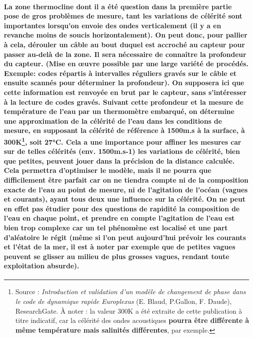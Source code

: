 \documentclass[a4paper,11pt]{article}
\begin{document}
\paragraph{\normalfont La zone thermocline dont il a \'{e}t\'{e} question dans la premi\`{e}re partie pose de \textbf{gros probl\`{e}mes de mesure}, tant les variations de c\'{e}l\'{e}rit\'{e} sont importantes lorsqu'on envoie des ondes verticalement (il y a en revanche moins de soucis horizontalement). On peut donc, pour pallier \`{a} cela, \textbf{d\'{e}rouler un c\^{a}ble} au bout duquel est accroch\'{e} au capteur pour passer au-del\`{a} de la zone.  \textbf{Il sera n\'{e}cessaire de conna\^{i}tre la profondeur du capteur}. (Mise en \oe{}uvre possible par une large vari\'{e}t\'{e} de proc\'{e}d\'{e}s. Exemple: codes r\'{e}partis \`{a} intervalles r\'{e}guliers grav\'{e}s sur le c\^{a}ble et ensuite scann\'{e}s pour d\'{e}terminer la profondeur). On \textbf{supposera} ici que cette information est renvoy\'{e}e en brut par le capteur, sans s'int\'{e}resser \`{a} la lecture de codes grav\'{e}s. \newline \newline
Suivant cette profondeur et la mesure de temp\'{e}rature de l'eau par un thermom\`{e}tre embarqu\'{e}, on \textbf{d\'{e}termine une approximation de la c\'{e}l\'{e}rit\'{e} de l'eau dans les conditions de mesure}, en supposant la c\'{e}l\'{e}rit\'{e} de r\'{e}f\'{e}rence \`{a} 1500m.s \`{a} la surface, \`{a} 300K\protect\footnote{Source : \textit{Introduction et validation d'un mod\`{e}le de changement de phase dans le code de dynamique rapide Europlexus} (E. Blaud, P.Gallon, F. Daude), ResearchGate. \`{A} noter : la valeur 300K a \'{e}t\'{e} extraite de cette publication \`{a} titre indicatif, car la c\'{e}l\'{e}rit\'{e} des ondes acoustiques \textbf{pourra \^{e}tre diff\'{e}rente \`{a} m\^{e}me temp\'{e}rature mais salinit\'{e}s diff\'{e}rentes}, par exemple.}, soit 27°C. Cela a une importance pour affiner les mesures car sur de telles c\'{e}l\'{e}rit\'{e}s (env. 1500m.s{-1}) les variations de c\'{e}l\'{e}rit\'{e}, bien que petites, peuvent jouer dans la pr\'{e}cision de la distance calcul\'{e}e. Cela permettra d'optimiser le mod\`{e}le, mais il ne pourra que difficilement \^{e}tre parfait car on ne tiendra compte \textbf{ni de la composition exacte de l'eau au point de mesure}, \textbf{ni de l'agitation de l'oc\'{e}an (vagues et courants)}, ayant tous deux une influence sur la c\'{e}l\'{e}rit\'{e}. On ne peut en effet pas \'{e}tudier pour des questions de rapidit\'{e} \textbf{la composition de l'eau en chaque point}, et prendre en compte l'agitation de l'eau est bien trop complexe car un tel ph\'{e}nom\`{e}ne est localis\'{e} et une part d'al\'{e}atoire le r\'{e}git (m\^{e}me si l'on peut aujourd'hui pr\'{e}voir les courants et l'\'{e}tat de la mer, il est \`{a} noter par exemple que de petites vagues peuvent se glisser au milieu de plus grosses vagues, rendant toute exploitation absurde). \newline
}
\end{document}
